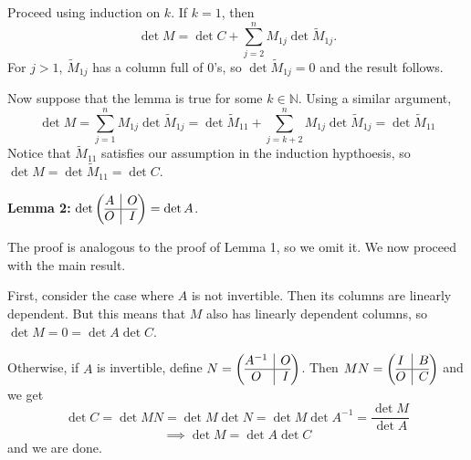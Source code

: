 \documentclass{eh-homework}
\begin{document}
\begin{question}{6}
    Proceed using induction on \(k\). If \(k = 1\), then
    \[
        \det M = \det C + \sum_{j=2}^{n} M_{1j} \det \tilde{M}_{1j}.
    \]
    For \(j > 1\), \(\tilde{M}_{1j}\) has a column full of 0's, so \(\det \tilde{M}_{1j} = 0\) and the result follows.

    Now suppose that the lemma is true for some \(k \in \mathbb{N}\). Using a similar argument,
    \[
        \det M = \sum_{j=1}^{n} M_{1j} \det \tilde{M}_{1j} = \det \tilde{M}_{11} + \sum_{j=k+2}^{n} M_{1j} \det \tilde{M}_{1j} = \det \tilde{M}_{11}
    \]
    Notice that \(\tilde{M}_{11}\) satisfies our assumption in the induction hypthoesis, so \(\det M = \det \tilde{M}_{11} = \det C\).

    \medskip

    \textbf{Lemma 2:} \(\det \left( \begin{array}{@{}c|c@{}}
        A & O \\
        \hline
        O & I
    \end{array} \right) = \det A\).

    The proof is analogous to the proof of Lemma 1, so we omit it. We now proceed with the main result.

    First, consider the case where \(A\) is not invertible. Then its columns are linearly dependent. But this means that \(M\) also has linearly dependent columns, so \(\det M = 0 = \det A \det C\).

    Otherwise, if \(A\) is invertible, define \(N = \left( \begin{array}{@{}c|c@{}}
        A^{-1} & O \\
        \hline
        O & I
    \end{array} \right)\). Then \(MN = \left( \begin{array}{@{}c|c@{}}
            I & B \\
            \hline
            O & C
        \end{array} \right)\) and we get
    \[
        \det C = \det MN = \det M \det N = \det M \det A^{-1} = \frac{\det M}{\det A}
    \]
    \[
        \implies \det M = \det A \det C
    \]
    and we are done.
    \end{question}
    \newpage
\end{document}
